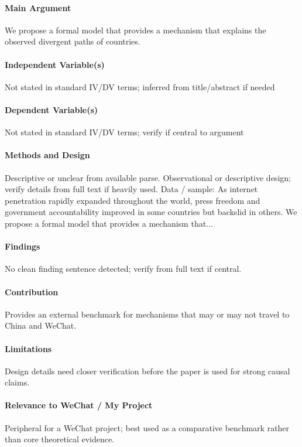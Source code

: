 \documentclass[12pt]{article}
\begin{document}
\paragraph{Main Argument} We propose a formal model that provides a mechanism that explains the observed divergent paths of countries.

\paragraph{Independent Variable(s)} Not stated in standard IV/DV terms; inferred from title/abstract if needed

\paragraph{Dependent Variable(s)} Not stated in standard IV/DV terms; verify if central to argument

\paragraph{Methods and Design} Descriptive or unclear from available parse. Observational or descriptive design; verify details from full text if heavily used. Data / sample: As internet penetration rapidly expanded throughout the world, press freedom and government accountability improved in some countries but backslid in others. We propose a formal model that provides a mechanism that...

\paragraph{Findings} No clean finding sentence detected; verify from full text if central.

\paragraph{Contribution} Provides an external benchmark for mechanisms that may or may not travel to China and WeChat.

\paragraph{Limitations} Design details need closer verification before the paper is used for strong causal claims.

\paragraph{Relevance to WeChat / My Project} Peripheral for a WeChat project; best used as a comparative benchmark rather than core theoretical evidence.
\end{document}
